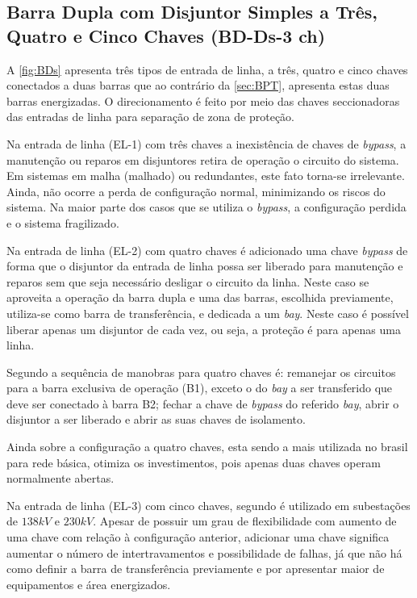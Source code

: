 		\subsection{Barra Dupla com Disjuntor Simples a Três, Quatro e Cinco Chaves (BD-Ds-3 ch)}
			A \autoref{fig:BDs} apresenta três tipos de entrada de linha, a três, quatro e cinco chaves conectados a duas barras que ao contrário da \autoref{sec:BPT}, apresenta estas duas barras energizadas. O direcionamento é feito por meio das chaves seccionadoras das entradas de linha para separação de zona de proteção.\par
			Na entrada de linha (EL-1) com três chaves a inexistência de chaves de \textit{bypass}, a manutenção ou reparos em disjuntores retira de operação o circuito do sistema. Em sistemas em malha (malhado) ou redundantes, este fato torna-se irrelevante. Ainda, não ocorre a perda de configuração normal, minimizando os riscos do sistema. Na maior parte dos casos que se utiliza o \textit{bypass}, a configuração perdida e o sistema fragilizado.\par
			Na entrada de linha (EL-2) com quatro chaves é adicionado uma chave \textit{bypass} de forma que o disjuntor da entrada de linha possa ser liberado para manutenção e reparos sem que seja necessário desligar o circuito da linha. Neste caso se aproveita a operação da barra dupla e uma das barras, escolhida previamente, utiliza-se como barra de transferência, e dedicada a um \textit{bay}. Neste caso é possível liberar apenas um disjuntor de cada vez, ou seja, a proteção é para apenas uma linha.\par
			Segundo  a sequência de manobras para quatro chaves é: remanejar os circuitos para a barra exclusiva de operação (B1), exceto o do \textit{bay} a ser transferido que deve ser conectado à barra B2; fechar a chave de \textit{bypass} do referido \textit{bay}, abrir o disjuntor a ser liberado e abrir as suas chaves de isolamento.\par
			Ainda sobre a configuração a quatro chaves, esta sendo a mais utilizada no brasil para rede básica, otimiza os investimentos, pois apenas duas chaves operam normalmente abertas.\par
			Na entrada de linha (EL-3) com cinco chaves, segundo \cite{book:equipAT} é utilizado em subestações de $138kV$ e $230kV$. Apesar de possuir um grau de flexibilidade com aumento de uma chave com relação à configuração anterior, adicionar uma chave significa aumentar o número de intertravamentos e possibilidade de falhas, já que não há como definir a barra de transferência previamente e por apresentar maior de equipamentos e área energizados.\par
